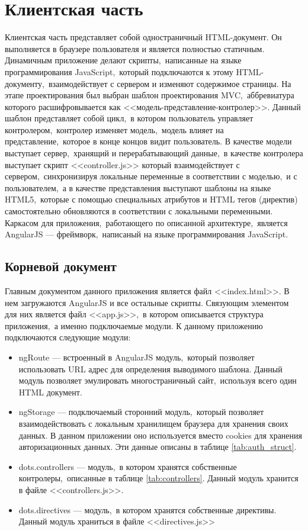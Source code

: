 \documentclass[14pt,a4paper]{report}
\begin{document}
\section{Клиентская часть}
Клиентская часть представляет собой одностраничный HTML-документ. Он выполняется в браузере пользователя и является полностью статичным. Динамичным приложение делают скрипты,~написанные на языке программирования JavaScript,~который подключаются к этому HTML-документу,~взаимодействует с сервером и изменяют содержимое страницы. На этапе проектирования был выбран шаблон проектирования MVC,~аббревиатура которого расшифровывается как <<модель-представление-контролер>>. Данный шаблон представляет собой цикл,~в котором пользователь управляет контролером,~контролер изменяет модель,~модель влияет на представление,~которое в конце концов видит пользователь. В качестве модели выступает сервер,~хранящий и перерабатывающий данные,~в качестве контролера выступает скрипт <<controller.js>> который взаимодействует с сервером,~синхронизируя локальные переменные в соответствии с моделью,~и с пользователем,~а в качестве представления выступают шаблоны на языке HTML5,~которые с помощью специальных атрибутов и HTML тегов (директив) самостоятельно обновляются в соответствии с локальными переменными. Каркасом для приложения,~работающего по описанной архитектуре,~является AngularJS --- фреймворк,~написаный на языке программирования JavaScript.

\subsection{Корневой документ}
Главным документом данного приложения является файл <<index.html>>. В нем загружаются AngularJS и все остальные скрипты. Связующим элементом для них является файл <<app.js>>,~в котором описывается структура приложения,~а именно подключаемые модули. К данному приложению подключаются следующие модули:
\begin{itemize}
\item ngRoute --- встроенный в AngularJS модуль,~который позволяет использовать URL адрес для определения выводимого шаблона. Данный модуль позволяет эмулировать многостраничный сайт,~используя всего один HTML документ.
\item ngStorage --- подключаемый сторонний модуль,~который позволяет взаимодействовать с локальным хранилищем браузера для хранения своих данных. В данном приложении оно используется вместо cookies для хранения авторизационных данных. Эти данные описаны в таблице \ref{tab:auth_struct}.
\item dots.controllers --- модуль,~в котором хранятся собственные контролеры,~описанные в таблице \ref{tab:controllers}. Данный модуль хранится в файле <<controllers.js>>.
\item dots.directives --- модуль,~в котором хранятся собственные директивы. Данный модуль храниться в файле <<directives.js>>
\end{itemize}
\end{document}

